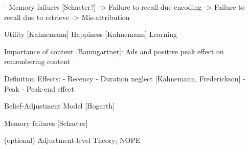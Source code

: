 \begin{itemize}
    - Memory failures [Schacter?]
    -> Failure to recall due encoding
    -> Failure to recall due to retrieve
    -> Mis-attribution

  Utility [Kahnemann]
  Happiness [Kahnemann]
  Learning

  Importance of content [Baumgartner]: Ads and positive peak effect on remembering content

  Definition Effects:
  - Recency
  - Duration neglect [Kahnemann, Frederickson]
  - Peak
  - Peak-end effect
  
  Belief-Adjustment Model [Hogarth]

	Memory failures [Schacter]

	
	(optional) Adjustment-level Theory; NOPE

\end{itemize}
